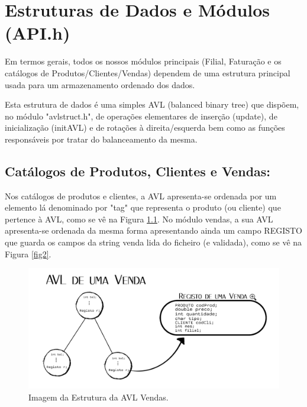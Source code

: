 \documentclass[a4paper,11pt]{report}
\begin{document}
\chapter{Estruturas de Dados e Módulos (API.h)}
\quad Em termos gerais, todos os nossos módulos principais (Filial, Faturação e os catálogos de Produtos/Clientes/Vendas) dependem de uma estrutura principal usada para um armazenamento ordenado dos dados.

\quad Esta estrutura de dados é uma simples AVL (balanced binary tree) que dispõem, no módulo "avlstruct.h", de operações elementares de inserção (update), de inicialização (initAVL) e de rotações à direita/esquerda bem como as funções responsáveis por tratar do balanceamento da mesma.


\section{Catálogos de Produtos, Clientes e Vendas:}

\quad Nos catálogos de produtos e clientes, a AVL apresenta-se ordenada por um elemento lá denominado por "tag" que representa o produto (ou cliente) que pertence à AVL, como se vê na Figura \ref{fig1}. No módulo vendas, a sua AVL apresenta-se ordenada da mesma forma apresentando ainda um campo REGISTO que guarda os campos da string venda lida do ficheiro (e validada), como se vê na Figura \ref{fig2}.

\begin{figure}[h!]
  \centering
  \includegraphics[scale=0.20]{Avl_Venda.png}
  \caption{Imagem da Estrutura da AVL Vendas.}
  \label{fig1}
\end{figure}
\end{document}
